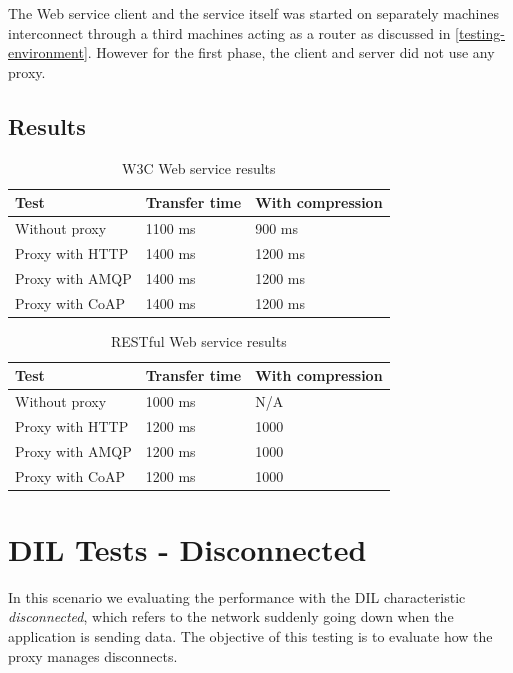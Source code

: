 The Web service client and the service itself was started on separately machines
interconnect through a third machines acting as a router as discussed in
\cref{testing-environment}. However for the first phase, the client and server
did not use any proxy.


\subsection{Results}

\begin{table}[h!]
\begin{tabular}{| l | l | l |}
\hline
  \textbf{Test} & \textbf{Transfer time} & \textbf{With compression}\\ \hline
  Without proxy & 1100 ms & 900 ms \\ \hline
  Proxy with HTTP & 1400 ms & 1200 ms \\ \hline
  Proxy with AMQP & 1400 ms & 1200 ms \\ \hline
  Proxy with CoAP & 1400 ms & 1200 ms \\ \hline
\end{tabular}
\caption{W3C Web service results}
\end{table}

\begin{table}[h!]
\begin{tabular}{| l | l | l |}
\hline
  \textbf{Test} & \textbf{Transfer time} & \textbf{With compression}\\ \hline
  Without proxy & 1000 ms & N/A \\ \hline
  Proxy with HTTP & 1200 ms & 1000\\ \hline
  Proxy with AMQP & 1200 ms & 1000\\ \hline
  Proxy with CoAP & 1200 ms & 1000\\ \hline
\end{tabular}
\caption{RESTful Web service results}
\end{table}


\section{DIL Tests - Disconnected}

In this scenario we evaluating the performance with the DIL characteristic
\textit{disconnected}, which refers to the network suddenly going down when the
application is sending data. The objective of this testing is to evaluate how
the proxy manages disconnects.

